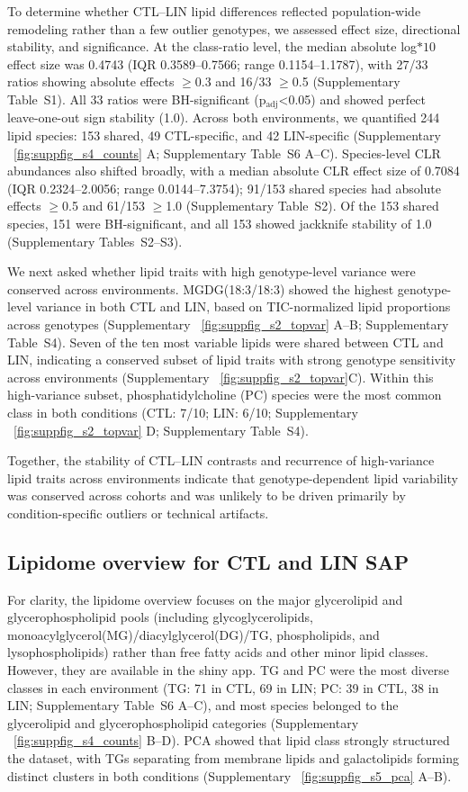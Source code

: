 \documentclass[9pt,twocolumn,twoside]{rilabRxiv}
\begin{document}
To determine whether CTL–LIN lipid differences reflected population-wide remodeling rather than a few outlier genotypes, we assessed effect size, directional stability, and significance. At the class-ratio level, the median absolute log$*{10}$ effect size was 0.4743 (IQR 0.3589–0.7566; range 0.1154–1.1787), with 27/33 ratios showing absolute effects $\geq$0.3 and 16/33 $\geq$0.5 (Supplementary Table~S1). All 33 ratios were BH-significant (p$_{\mathrm{adj}}$<0.05) and showed perfect leave-one-out sign stability (1.0). Across both environments, we quantified 244 lipid species: 153 shared, 49 CTL-specific, and 42 LIN-specific (Supplementary ~\ref{fig:suppfig_s4_counts} A; Supplementary Table~S6 A--C). Species-level CLR abundances also shifted broadly, with a median absolute CLR effect size of 0.7084 (IQR 0.2324–2.0056; range 0.0144–7.3754); 91/153 shared species had absolute effects $\geq$0.5 and 61/153 $\geq$1.0 (Supplementary Table~S2). Of the 153 shared species, 151 were BH-significant, and all 153 showed jackknife stability of 1.0 (Supplementary Tables~S2--S3).

We next asked whether lipid traits with high genotype-level variance were conserved across environments. MGDG(18:3/18:3) showed the highest genotype-level variance in both CTL and LIN, based on TIC-normalized lipid proportions across genotypes (Supplementary ~\ref{fig:suppfig_s2_topvar} A--B; Supplementary Table~S4). Seven of the ten most variable lipids were shared between CTL and LIN, indicating a conserved subset of lipid traits with strong genotype sensitivity across environments (Supplementary ~\ref{fig:suppfig_s2_topvar}C). Within this high-variance subset, phosphatidylcholine (PC) species were the most common class in both conditions (CTL: 7/10; LIN: 6/10; Supplementary ~\ref{fig:suppfig_s2_topvar} D; Supplementary Table~S4).

Together, the stability of CTL--LIN contrasts and recurrence of high-variance lipid traits across environments indicate that genotype-dependent lipid variability was conserved across cohorts and was unlikely to be driven primarily by condition-specific outliers or technical artifacts.

\subsection{Lipidome overview for CTL and LIN SAP}

For clarity, the lipidome overview focuses on the major glycerolipid and glycerophospholipid pools (including glycoglycerolipids, monoacylglycerol(MG)/diacylglycerol(DG)/TG, phospholipids, and lysophospholipids) rather than free fatty acids and other minor lipid classes. However, they are available in the shiny app. TG and PC were the most diverse classes in each environment (TG: 71 in CTL, 69 in LIN; PC: 39 in CTL, 38 in LIN; Supplementary Table~S6 A--C), and most species belonged to the glycerolipid and glycerophospholipid categories (Supplementary ~\ref{fig:suppfig_s4_counts} B--D). PCA showed that lipid class strongly structured the dataset, with TGs separating from membrane lipids and galactolipids forming distinct clusters in both conditions (Supplementary ~\ref{fig:suppfig_s5_pca} A--B).
\end{document}
